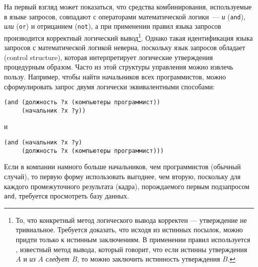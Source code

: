  На 
первый взгляд может показаться, что средства
комбинирования, используемые в языке запросов, совпадают с операторами
математической логики~--- {\em и} ({\tt and}),
{\em или} ({\tt or}) и отрицанием ({\tt not}), а
при применении правил языка запросов производится корректный
логический вывод\footnote{То, что 
конкретный метод логического вывода корректен
--- утверждение не тривиальное.  Требуется доказать, что исходя из
истинных посылок, можно придти только к истинным заключениям.  В
применении правил используется , известный
метод вывода, который говорит, что если истинны утверждения
$A$ и {\em из $A$ следует
$B$}, то можно заключить истинность утверждения
$B$.}.
Однако такая идентификация языка запросов с математической логикой
неверна, поскольку язык запросов обладает 
 (control 
structure),
которая интерпретирует логические утверждения процедурным образом.
Часто из этой структуры управления можно извлечь пользу.  Например,
чтобы найти начальников всех программистов, можно сформулировать запрос
двумя логически эквивалентными способами:

\begin{Verbatim}[fontsize=\small]
(and (должность ?x (компьютеры программист))
     (начальник ?x ?y))
\end{Verbatim}
и

\begin{Verbatim}[fontsize=\small]
(and (начальник ?x ?y)
     (должность ?x (компьютеры программист)))
\end{Verbatim}
Если в компании 
намного 
больше начальников, чем программистов (обычный
случай), то первую форму использовать выгоднее, чем вторую, поскольку
для каждого промежуточного результата (кадра), порождаемого первым
подзапросом {\tt and}, требуется просмотреть базу данных.

